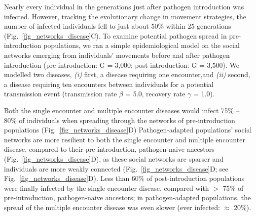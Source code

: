 Nearly every individual in the generations just after pathogen introduction was infected.
However, tracking the evolutionary change in movement strategies, the number of infected individuals fell to just about 50\% within 25 generations (Fig.~\ref{fig_networks_disease}C).
To examine potential pathogen spread in pre-introduction populations, we ran a simple epidemiological model on the social networks emerging from individuals' movements before and after pathogen introduction (pre-introduction: G = 3,000; post-introduction: G = 3,500).
We modelled two diseases, \textit{(i)} first, a disease requiring one encounter,and \textit{(ii)} second, a disease requiring ten encounters between individuals for a potential transmission event (transmission rate $\beta$ = 5.0, recovery rate $\gamma$ = 1.0).

Both the single encounter and multiple encounter diseases would infect 75\% -- 80\% of individuals when spreading through the networks of pre-introduction populations (Fig.~\ref{fig_networks_disease}D)
Pathogen-adapted populations' social networks are more resilient to both the single encounter and multiple encounter disease, compared to their pre-introduction, pathogen-naive ancestors (Fig.~\ref{fig_networks_disease}D), as these social networks are sparser and individuals are more weakly connected (Fig.~\ref{fig_networks_disease}D; see Fig.~\ref{fig_networks_disease}D).
Less than 60\% of post-introduction populations were finally infected by the single encounter disease, compared with $>$ 75\% of pre-introduction, pathogen-naive ancestors; in pathogen-adapted populations, the spread of the multiple encounter disease was even slower (ever infected: $\approx$ 20\%).

